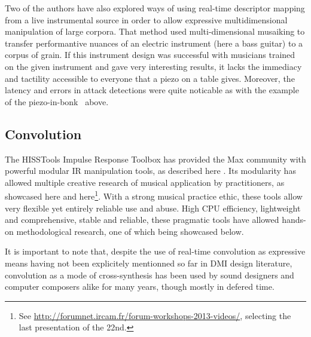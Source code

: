 
Two of the authors have also explored ways of using real-time descriptor mapping from a live instrumental source in order to allow expressive multidimensional manipulation of large corpora\cite{TremblaySchwarz-nime2010-surfing-the-waves}. That method used multi-dimensional musaiking to transfer performantive nuances of an electric instrument (here a bass guitar) to a corpus of grain. If this instrument design was successful with musicians trained on the given instrument and gave very interesting results, it lacks the immediacy and tactility accessible to everyone that a piezo on a table gives. Moreover, the latency and errors in attack detections were quite noticable as with the example of the piezo-in-bonk~ above.


\subsection{Convolution}

The HISSTools Impulse Response Toolbox has provided the Max community with powerful modular IR manipulation tools, as described here \cite{HarkerTremblay-icmc2012-hisstools}. Its modularity has allowed multiple creative research of musical application by practitioners, as showcased here \cite{HarkerTremblay-forum2013-rethinking-the-box} and here\footnote{See \url{http://forumnet.ircam.fr/forum-workshops-2013-videos/}, selecting the last presentation of the 22nd.}. With a strong musical practice ethic, these tools allow very flexible yet entirely reliable use and abuse. High CPU efficiency, lightweight and comprehensive, stable and reliable, these pragmatic tools have allowed hands-on methodological research, one of which being showcased below.

It is important to note that, despite the use of real-time convolution as expressive means having not been explicitely mentionned so far in DMI design literature, convolution as a mode of cross-synthesis has been used by sound designers and computer composers alike for many years, though mostly in defered time.